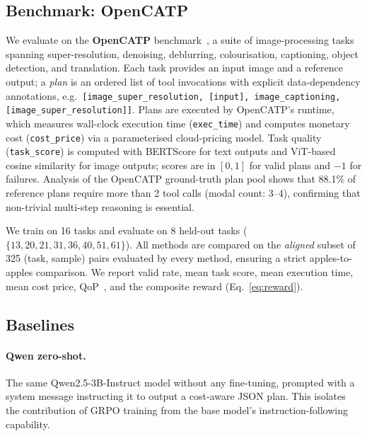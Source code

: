 \documentclass[10pt,twocolumn]{article}
\begin{document}
\subsection{Benchmark: OpenCATP}
We evaluate on the \textbf{OpenCATP} benchmark~\cite{openCATPlm2024},
a suite of image-processing tasks spanning super-resolution, denoising,
deblurring, colourisation, captioning, object detection, and translation.
Each task provides an input image and a reference output; a \emph{plan}
is an ordered list of tool invocations with explicit data-dependency
annotations, e.g.\
\texttt{[image\_super\_resolution, [input], image\_captioning,
[image\_super\_resolution]]}.
Plans are executed by OpenCATP's runtime, which measures wall-clock
execution time (\texttt{exec\_time}) and computes monetary cost
(\texttt{cost\_price}) via a parameterised cloud-pricing model.
Task quality (\texttt{task\_score}) is computed with BERTScore for text
outputs and ViT-based cosine similarity for image outputs; scores are in
$[0,1]$ for valid plans and $-1$ for failures.
Analysis of the OpenCATP ground-truth plan pool shows that 88.1\% of
reference plans require more than 2 tool calls (modal count: 3--4),
confirming that non-trivial multi-step reasoning is essential.

We train on 16 tasks and evaluate on 8 held-out tasks
($\{13, 20, 21, 31, 36, 40, 51, 61\}$).
All methods are compared on the \emph{aligned} subset of 325
(task, sample) pairs evaluated by every method, ensuring a strict
apples-to-apples comparison.
We report valid rate, mean task score, mean execution time, mean cost
price, QoP~\cite{openCATPlm2024}, and the composite reward
(Eq.~\ref{eq:reward}).

\subsection{Baselines}

\paragraph{Qwen zero-shot.}
The same Qwen2.5-3B-Instruct model without any fine-tuning, prompted
with a system message instructing it to output a cost-aware JSON plan.
This isolates the contribution of GRPO training from the base model's
instruction-following capability.
\end{document}
